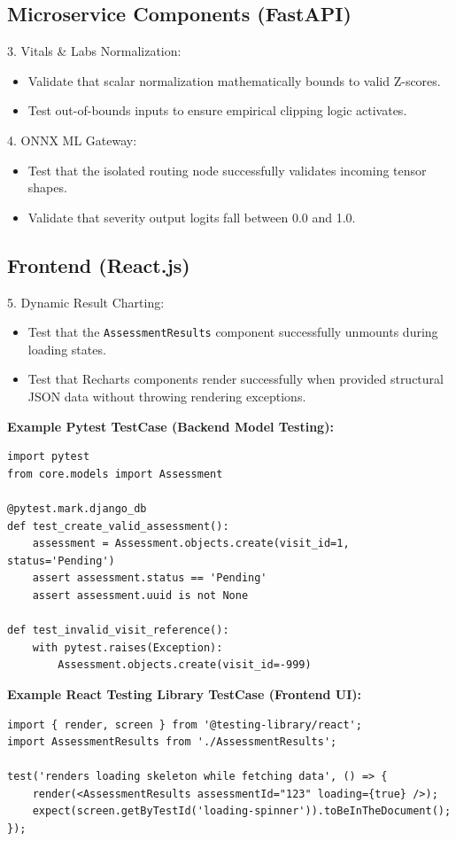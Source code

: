 \documentclass{fisatprojectfinal}
\begin{document}
\subsection*{Microservice Components (FastAPI)}
3. Vitals \& Labs Normalization:
\begin{itemize}
    \item Validate that scalar normalization mathematically bounds to valid Z-scores.
    \item Test out-of-bounds inputs to ensure empirical clipping logic activates.
\end{itemize}

4. ONNX ML Gateway:
\begin{itemize}
    \item Test that the isolated routing node successfully validates incoming tensor shapes.
    \item Validate that severity output logits fall between 0.0 and 1.0.
\end{itemize}

\subsection*{Frontend (React.js)}
5. Dynamic Result Charting:
\begin{itemize}
    \item Test that the \texttt{AssessmentResults} component successfully unmounts during loading states.
    \item Test that Recharts components render successfully when provided structural JSON data without throwing rendering exceptions.
\end{itemize}

\textbf{Example Pytest TestCase (Backend Model Testing):}
\begin{verbatim}
import pytest
from core.models import Assessment

@pytest.mark.django_db
def test_create_valid_assessment():
    assessment = Assessment.objects.create(visit_id=1, status='Pending')
    assert assessment.status == 'Pending'
    assert assessment.uuid is not None

def test_invalid_visit_reference():
    with pytest.raises(Exception):
        Assessment.objects.create(visit_id=-999)
\end{verbatim}

\textbf{Example React Testing Library TestCase (Frontend UI):}
\begin{verbatim}
import { render, screen } from '@testing-library/react';
import AssessmentResults from './AssessmentResults';

test('renders loading skeleton while fetching data', () => {
    render(<AssessmentResults assessmentId="123" loading={true} />);
    expect(screen.getByTestId('loading-spinner')).toBeInTheDocument();
});
\end{verbatim}
\end{document}

